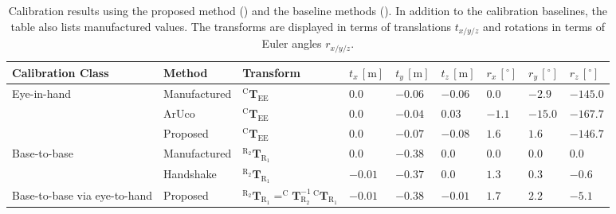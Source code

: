 \begin{landscape}
\begin{table}[]
\caption{Calibration results using the proposed method () and the baseline methods (). In addition to the calibration baselines, the table also lists manufactured values. The transforms are displayed in terms of translations $t_{x/y/z}$ and rotations in terms of Euler angles $r_{x/y/z}$.}
\label{c1:tab:calibration_results}
\centering
\begin{tabular}{|l|l|l|l|l|l|l|l|l|}
\hline
Calibration Class             & Method       & Transform                                                                                                        & $t_x\,[\text{m}]$ & $t_y\,[\text{m}]$ & $t_z\,[\text{m}]$ & $r_x\,[^\circ]$ & $r_y\,[^\circ]$ & $r_z\,[^\circ]$ \\ \hline
\multirow{3}{*}{Eye-in-hand}  & Manufactured & $^\text{C}\mathbf{T}_\text{EE}$                                                                                  & $ 0.0$            & $-0.06$           & $-0.06$           & $ 0.0$          & $-2.9$          & $-145.0$        \\ \cline{2-9} 
                              & ArUco        & $^\text{C}\mathbf{T}_\text{EE}$                                                                                  & $ 0.0$            & $-0.04$           & $ 0.03$           & $-1.1$          & $-15.0$         & $-167.7$        \\ \cline{2-9} 
                              & Proposed     & $^\text{C}\mathbf{T}_\text{EE}$                                                                                  & $ 0.0$            & $-0.07$           & $-0.08$           & $ 1.6$          & $ 1.6$          & $-146.7$        \\ \hline
\multirow{2}{*}{Base-to-base} & Manufactured & $^{\text{R}_2}\mathbf{T}_{\text{R}_1}$                                                                           & $ 0.0$            & $-0.38$           & $ 0.0$            & $0.0$           & $0.0$           & $ 0.0$          \\ \cline{2-9}
                              & Handshake    & $^{\text{R}_2}\mathbf{T}_{\text{R}_1}$                                                                           & $-0.01$           & $-0.37$           & $ 0.0$            & $1.3$           & $0.3$           & $-0.6$          \\ \hline
Base-to-base via eye-to-hand  & Proposed     & $^{\text{R}_2}\mathbf{T}_{\text{R}_1} = ^\text{C}\mathbf{T}^{-1}_{\text{R}_2}\,^\text{C}\mathbf{T}_{\text{R}_1}$ & $-0.01$           & $-0.38$           & $-0.01$           & $1.7$           & $2.2$           & $-5.1$          \\ \hline
\end{tabular}
\end{table}
\end{landscape}

